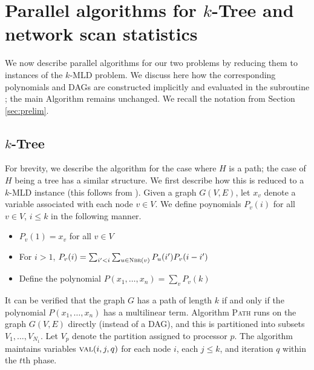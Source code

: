 \section{Parallel algorithms for $k$-Tree and network scan statistics}
\label{sec:applications}

We now describe parallel algorithms for our two problems by reducing them to
instances of the $k$-MLD problem. We discuss here how the corresponding polynomials
and DAGs are constructed implicitly and evaluated in the subroutine \parcircuit{};
the main Algorithm \parmaxwt{} remains unchanged. We recall the notation from Section \ref{sec:prelim}.

\subsection{$k$-Tree}
\label{sec:apps-trees}
For brevity, we describe the algorithm for the case where $H$ is a path; the
case of $H$ being a tree has a similar structure. We first describe how this is
reduced to a $k$-MLD instance (this follows from \cite{koutis:icalp08, williams2009finding}). Given a graph $G(V, E)$, let $x_v$ denote a variable associated with each node $v\in V$.
We define poynomials $P_v(i)$ for all $v\in V$, $i\leq k$ in the following manner.

\begin{itemize}
\item
$P_v(1) = x_v$ for all $v\in V$
\item
For $i>1$,
$P_v(i) = \sum_{i'<i} \sum_{u\in\textsc{Nbr}(v)} P_u(i')P_v(i-i')$
\item
Define the polynomial $P(x_1,\ldots,x_n) = \sum_v P_v(k)$
\end{itemize}

It can be verified that the graph $G$ has a path of length $k$ if and only if the
polynomial $P(x_1,\ldots,x_n)$ has a multilinear term. Algorithm \parcircuit\textsc{Path}
runs on the graph $G(V, E)$ directly (instead of a DAG), and this is partitioned
into subsets $V_1,\ldots, V_{N_1}$. Let $V_p$ denote the partition assigned to processor $p$.
The algorithm maintains variables $\textsc{val}(i, j, q)$ for each node $i$, each $j\leq k$, and
iteration $q$ within the $t$th phase.

